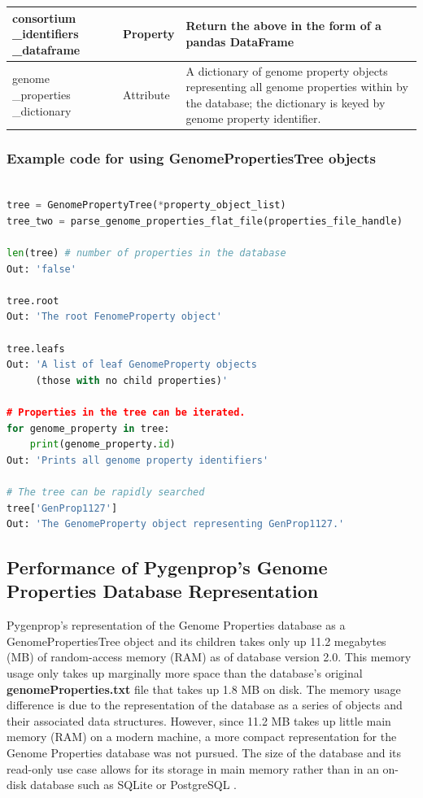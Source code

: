 \begin{longtable}{|p{2.7cm}|p{2cm}|p{10cm}|}
consortium \_identifiers \_dataframe   & Property  & Return the above in the form of a pandas DataFrame  \cite{mckinney2010data}                                                        \\ \hline
genome \_properties \_dictionary    & Attribute  & A dictionary of genome property objects representing all genome properties within by the database; the dictionary is keyed by genome property identifier.                              \\ \hline
\end{longtable}

\subsubsection{Example code for using GenomePropertiesTree objects}

\begin{lstlisting}[language=Python]

tree = GenomePropertyTree(*property_object_list)
tree_two = parse_genome_properties_flat_file(properties_file_handle)
	
len(tree) # number of properties in the database
Out: 'false'

tree.root
Out: 'The root FenomeProperty object'

tree.leafs
Out: 'A list of leaf GenomeProperty objects 
     (those with no child properties)'

# Properties in the tree can be iterated.
for genome_property in tree: 
	print(genome_property.id)
Out: 'Prints all genome property identifiers'

# The tree can be rapidly searched
tree['GenProp1127'] 
Out: 'The GenomeProperty object representing GenProp1127.'

\end{lstlisting}

\subsection{Performance of Pygenprop's Genome Properties Database Representation}

Pygenprop's representation of the Genome Properties database as a GenomePropertiesTree object and its children takes only up 11.2 megabytes (MB) of random-access memory (RAM) as of database version 2.0. This memory usage only takes up marginally more space than the database's original \textbf{genomeProperties.txt} file that takes up 1.8 MB on disk. The memory usage difference is due to the representation of the database as a series of objects and their associated data structures. However, since 11.2 MB takes up little main memory (RAM) on a modern machine, a more compact representation for the Genome Properties database was not pursued. The size of the database and its read-only use case allows for its storage in main memory rather than in an on-disk database such as SQLite \cite{owens2006definitive} or PostgreSQL \cite{momjian2001postgresql}.

